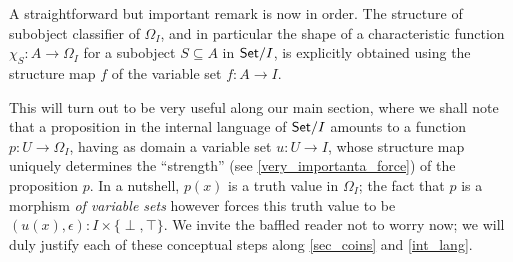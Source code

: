 

\begin{remark}
	A straightforward but important remark is now in order. The structure of subobject classifier of $\Omega_I$, and in particular the shape of a characteristic function $\chi_S : A \to \Omega_I$ for a subobject $S\subseteq A$ in $\mathsf{Set}/I$, is explicitly obtained using the structure map $f$ of the variable set $f : A\to I$.

	This will turn out to be very useful along our main section, where we shall note that a proposition in the internal language of $\mathsf{Set}/I$ amounts to a function $p : U \to \Omega_I$, having as domain a variable set $u : U \to I$, whose structure map uniquely determines the ``strength'' (see \autoref{very_importanta_force}) of the proposition $p$. In a nutshell, $p(x)$ is a truth value in $\Omega_I$; the fact that $p$ is a morphism \emph{of variable sets} however forces this truth value to be $(u(x),\epsilon) : I\times \{\perp,\top\}$. We invite the baffled reader not to worry now; we will duly justify each of these conceptual steps along \autoref{sec_coins} and \ref{int_lang}.
\end{remark}
